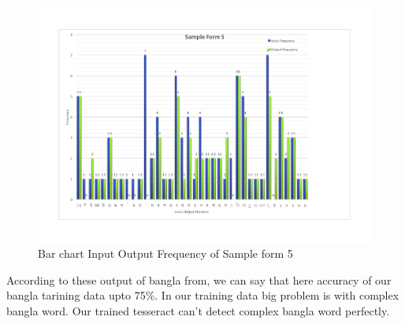\begin{figure}[H]
\centering
\includegraphics[width=1\textwidth]{Bform5.pdf}
\caption {Bar chart Input Output Frequency of Sample form 5}
\label {fig:Bbar5}
\end{figure}

According to these output of bangla from, we can say that here accuracy of our bangla tarining data upto 75\%. In our training data big problem is with complex bangla word. Our trained tesseract can't detect complex bangla word perfectly.
